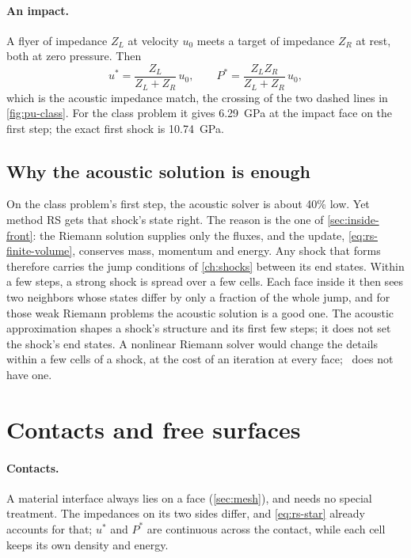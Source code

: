 \paragraph{An impact.} A flyer of impedance $Z_L$ at velocity $u_0$ meets a
target of impedance $Z_R$ at rest, both at zero pressure. Then
\begin{equation}
u^* = \frac{Z_L}{Z_L + Z_R}\,u_0,
\qquad
P^* = \frac{Z_L Z_R}{Z_L + Z_R}\,u_0,
\label{eq:rs-impact}
\end{equation}
which is the acoustic impedance match, the crossing of the two dashed
lines in \cref{fig:pu-class}. For the class problem it gives 6.29~GPa at
the impact face on the first step; the exact first shock is 10.74~GPa.

\subsection{Why the acoustic solution is enough}
\label{sec:rs-why-acoustic}

On the class problem's first step, the acoustic solver is about 40\% low.
Yet method RS gets that shock's state right. The reason is the one of
\cref{sec:inside-front}: the Riemann solution supplies only the fluxes, and
the update, \cref{eq:rs-finite-volume}, conserves mass, momentum and
energy. Any shock that forms therefore carries the jump conditions of
\cref{ch:shocks} between its end states. Within a few steps, a strong shock
is spread over a few cells. Each face inside it then sees two neighbors
whose states differ by only a fraction of the whole jump, and for those
weak Riemann problems the acoustic solution is a good one. The acoustic
approximation shapes a shock's structure and its first few steps; it does
not set the shock's end states.
A nonlinear Riemann solver would change the details within a few cells of a
shock, at the cost of an iteration at every face; \bw\ does not have one.

\section{Contacts and free surfaces}
\label{sec:rs-boundaries}

\paragraph{Contacts.} A material interface always lies on a face
(\cref{sec:mesh}), and needs no special treatment. The impedances on its
two sides differ, and \cref{eq:rs-star} already accounts for that; $u^*$
and $P^*$ are continuous across the contact, while each cell keeps its own
density and energy.


